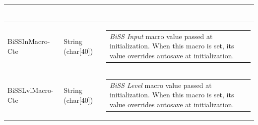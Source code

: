 \documentclass[openany]{article}
\begin{document}
\begin{longtable}{| m{4.5cm} m{2.5cm}  m{8.5cm} |}
\begin{tabular}{@{}m{6cm}@{}}
            \end{tabular} \hypertarget{pv:biss-in-macro-cte}{}\\ \hline
        BiSSInMacro-Cte & String (char[40]) & \begin{tabular}{@{}m{6cm}@{}}
                \emph{BiSS Input} macro value passed at initialization. When this macro is set, its value overrides autosave at initialization.
            \end{tabular} \hypertarget{pv:biss-lvl-macro-cte}{}\\ \hline
        BiSSLvlMacro-Cte & String (char[40]) & \begin{tabular}{@{}m{6cm}@{}}
                \emph{BiSS Level} macro value passed at initialization. When this macro is set, its value overrides autosave at initialization\cite{mtrrec}.
            \end{tabular} \hypertarget{}{}\\ \hline
    \end{longtable}
\end{document}
